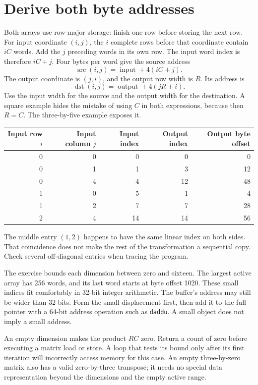 \section{Derive both byte addresses}
Both arrays use row-major storage: finish one row before storing the next row.
For input coordinate \((i,j)\), the \(i\) complete rows before that coordinate
contain \(iC\) words. Add the \(j\) preceding words in its own row. The input
word index is therefore \(iC+j\). Four bytes per word give the source address
\[
  \operatorname{src}(i,j)=\operatorname{input}+4(iC+j).
\]
The output coordinate is \((j,i)\), and the output row width is \(R\). Its address is
\[
  \operatorname{dst}(i,j)=\operatorname{output}+4(jR+i).
\]
Use the input width for the source and the output width for the destination.
A square example hides the mistake of using \(C\) in both expressions, because
then \(R=C\). The three-by-five example exposes it.

\begin{longtable}{rrrrr}
  \toprule
  Input row \(i\) & Input column \(j\) & Input index & Output index & Output byte offset \\
  \midrule
  0               & 0                  & 0           & 0            & 0                  \\
  0               & 1                  & 1           & 3            & 12                 \\
  0               & 4                  & 4           & 12           & 48                 \\
  1               & 0                  & 5           & 1            & 4                  \\
  1               & 2                  & 7           & 7            & 28                 \\
  2               & 4                  & 14          & 14           & 56                 \\
  \bottomrule
\end{longtable}
The middle entry \((1,2)\) happens to have the same linear index on both sides.
That coincidence does not make the rest of the transformation a sequential copy.
Check several off-diagonal entries when tracing the program.

The exercise bounds each dimension between zero and sixteen. The largest active
array has 256 words, and its last word starts at byte offset 1020. These small
indices fit comfortably in 32-bit integer arithmetic. The buffer's address may
still be wider than 32 bits. Form the small displacement first, then add it to
the full pointer with a 64-bit address operation such as \texttt{daddu}. A small
object does not imply a small address.

An empty dimension makes the product \(RC\) zero. Return a count of zero before
executing a matrix load or store. A loop that tests its bound only after its
first iteration will incorrectly access memory for this case. An empty
three-by-zero matrix also has a valid zero-by-three transpose; it needs no
special data representation beyond the dimensions and the empty active range.
